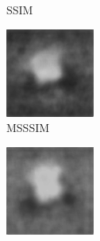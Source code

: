 \begin{figure}[H]
\begin{subfigure}[t]{0.13\textwidth}
    \caption{SSIM}
  \end{subfigure}
  \begin{subfigure}[t]{0.13\textwidth}
    \centering
    \includegraphics[width=\linewidth]{img/one-trial/prediction_4_msssim.png}
    \caption{MSSSIM}
  \end{subfigure}
  \begin{subfigure}[t]{0.13\textwidth}
    \centering
    \includegraphics[width=\linewidth]{img/one-trial/prediction_4_mix.png}

\end{subfigure}
\end{figure}
